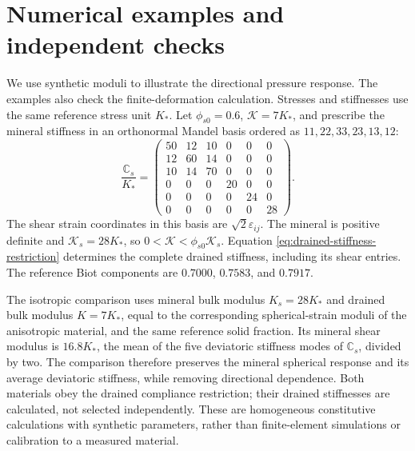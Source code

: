 \section{Numerical examples and independent checks}
\label{sec:experiments}

We use synthetic moduli to illustrate the directional pressure response.
The examples also check the finite-deformation calculation. Stresses and stiffnesses use the same
reference stress unit \(K_*\). Let \(\phi_{s0}=0.6\),
\(\mathcal{K}=7K_*\), and prescribe the mineral stiffness in an orthonormal Mandel
basis ordered as \(11,22,33,23,13,12\):
\begin{equation}
 \frac{\mathbb{C}_s}{K_*}=\begin{pmatrix}
 50&12&10&0&0&0\\
 12&60&14&0&0&0\\
 10&14&70&0&0&0\\
 0&0&0&20&0&0\\
 0&0&0&0&24&0\\
 0&0&0&0&0&28
 \end{pmatrix}.
 \label{eq:example-mineral-stiffness}
\end{equation}
The shear strain coordinates in this basis are \(\sqrt2\varepsilon_{ij}\).
The mineral is positive definite and \(\mathcal{K}_s=28K_*\), so
\(0<\mathcal{K}<\phi_{s0}\mathcal{K}_s\). Equation \eqref{eq:drained-stiffness-restriction}
determines the complete drained stiffness, including its shear entries.
The reference Biot components are \(0.7000\), \(0.7583\), and \(0.7917\).

The isotropic comparison uses mineral bulk modulus \(K_s=28K_*\) and
drained bulk modulus \(K=7K_*\), equal to the corresponding spherical-strain
moduli of the anisotropic material, and the same reference solid fraction. Its
mineral shear modulus is \(16.8K_*\), the mean of the five deviatoric
stiffness modes of \(\mathbb C_s\), divided by two. The comparison therefore
preserves the mineral spherical response and its average deviatoric
stiffness, while removing directional dependence. Both materials obey the
drained compliance restriction; their drained stiffnesses are calculated,
not selected independently. These are homogeneous constitutive
calculations with synthetic parameters, rather than finite-element
simulations or calibration to a measured material.

